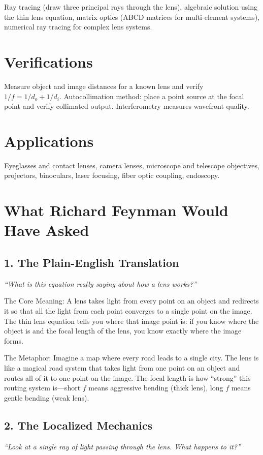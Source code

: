 Ray tracing (draw three principal rays through the lens), algebraic solution using the thin lens equation, matrix optics (ABCD matrices for multi-element systems), numerical ray tracing for complex lens systems.
\section*{Verifications}

Measure object and image distances for a known lens and verify $1/f = 1/d_o + 1/d_i$. Autocollimation method: place a point source at the focal point and verify collimated output. Interferometry measures wavefront quality.
\section*{Applications}

Eyeglasses and contact lenses, camera lenses, microscope and telescope objectives, projectors, binoculars, laser focusing, fiber optic coupling, endoscopy.
\section*{What Richard Feynman Would Have Asked}

\subsection*{1. The Plain-English Translation}
\textit{``What is this equation really saying about how a lens works?''}

The Core Meaning: A lens takes light from every point on an object and redirects it so that all the light from each point converges to a single point on the image. The thin lens equation tells you where that image point is: if you know where the object is and the focal length of the lens, you know exactly where the image forms.

The Metaphor: Imagine a map where every road leads to a single city. The lens is like a magical road system that takes light from one point on an object and routes all of it to one point on the image. The focal length is how ``strong'' this routing system is---short $f$ means aggressive bending (thick lens), long $f$ means gentle bending (weak lens).

\subsection*{2. The Localized Mechanics}
\textit{``Look at a single ray of light passing through the lens. What happens to it?''}

